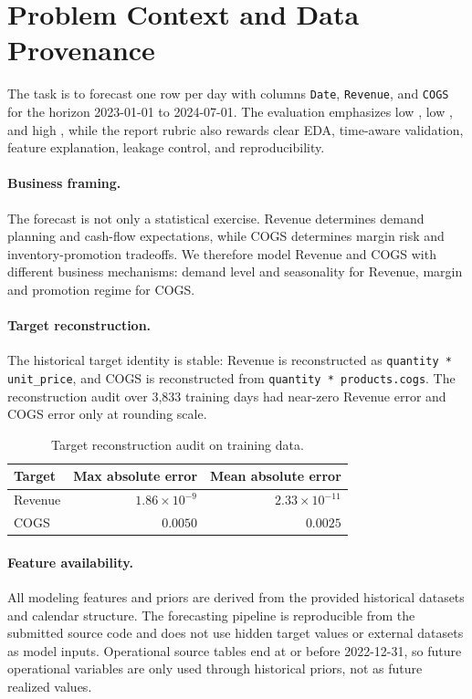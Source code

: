 \section{Problem Context and Data Provenance}

The task is to forecast one row per day with columns \texttt{Date}, \texttt{Revenue}, and \texttt{COGS} for the horizon 2023-01-01 to 2024-07-01. The evaluation emphasizes low , low , and high , while the report rubric also rewards clear EDA, time-aware validation, feature explanation, leakage control, and reproducibility.

\paragraph{Business framing.}
The forecast is not only a statistical exercise. Revenue determines demand planning and cash-flow expectations, while COGS determines margin risk and inventory-promotion tradeoffs. We therefore model Revenue and COGS with different business mechanisms: demand level and seasonality for Revenue, margin and promotion regime for COGS.

\paragraph{Target reconstruction.}
The historical target identity is stable: Revenue is reconstructed as \texttt{quantity * unit\_price}, and COGS is reconstructed from \texttt{quantity * products.cogs}. The reconstruction audit over 3,833 training days had near-zero Revenue error and COGS error only at rounding scale.

\begin{table}[h]
\centering
\caption{Target reconstruction audit on training data.}
\label{tab:target_identity}
\begin{tabular}{lrr}
\toprule
Target & Max absolute error & Mean absolute error \\
\midrule
Revenue & $1.86 \times 10^{-9}$ & $2.33 \times 10^{-11}$ \\
COGS & $0.0050$ & $0.0025$ \\
\bottomrule
\end{tabular}
\end{table}

\paragraph{Feature availability.}
All modeling features and priors are derived from the provided historical datasets and calendar structure. The forecasting pipeline is reproducible from the submitted source code and does not use hidden target values or external datasets as model inputs. Operational source tables end at or before 2022-12-31, so future operational variables are only used through historical priors, not as future realized values.

